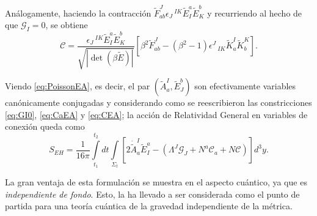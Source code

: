An\'{a}logamente, haciendo la contracci\'{o}n $\tilde{F}^{J}_{ab} \epsilon_{J}\,^{IK} \tilde{E}^{a}_{I} \tilde{E}^{b}_{K}$ y recurriendo al hecho de que $\mathcal{G}_{I} = 0$, se obtiene
%
\begin{equation}
\label{eq:CEA}
\mathcal{C} = \frac{\epsilon_{J}\,^{IK} \tilde{E}^{a}_{I} \tilde{E}^{b}_{K}}{\sqrt{|\det(\beta \tilde{E})|}} \left[\beta^{2} \tilde{F}^{J}_{ab} - (\beta^{2} - 1) \epsilon^{J}\,_{IK} \tilde{K}^{I}_{a} \tilde{K}^{K}_{b} \right].
\end{equation}

Viendo \eqref{eq:PoissonEA}, es decir, el par $(\tilde{A}^{I}_{a}, \tilde{E}^{b}_{J})$ son efectivamente variables can\'{o}nicamente conjugadas y considerando como se reescribieron las constricciones \eqref{eq:GI0}, \eqref{eq:CaEA} y \eqref{eq:CEA}; la acci\'{o}n de Relatividad General en variables de conexi\'{o}n queda como
%
\begin{equation}
S_{EH} = \frac{1}{16 \pi} \int\limits^{t_{2}}_{t_{1}} dt \int\limits_{\Sigma_{t}} \left[2 \dot{\tilde{A}}^{I}_{a} \tilde{E}^{a}_{I} - (\Lambda^{J} \mathcal{G}_{J} + N^{a} \mathcal{C}_{a} + N \mathcal{C}) \right] d^{3} y.
\end{equation}

La gran ventaja de esta formulaci\'{o}n se muestra en el aspecto cu\'{a}ntico, ya que es \emph{independiente de fondo}. Esto, la ha llevado a ser considerada como el punto de partida para una teor\'{i}a cu\'{a}ntica de la gravedad independiente de la m\'{e}trica.
